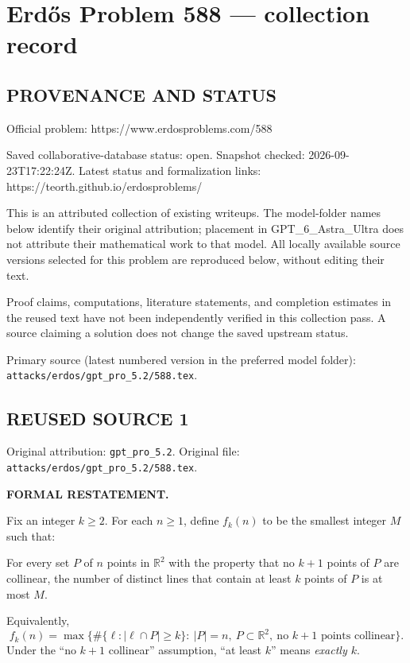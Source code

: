 \section*{Erd\H{o}s Problem 588 --- collection record}

\subsection*{PROVENANCE AND STATUS}
Official problem: https://www.erdosproblems.com/588

Saved collaborative-database status: open.
Snapshot checked: 2026-09-23T17:22:24Z.
Latest status and formalization links: https://teorth.github.io/erdosproblems/

This is an attributed collection of existing writeups. The model-folder names below identify their original attribution; placement in GPT\_6\_Astra\_Ultra does not attribute their mathematical work to that model. All locally available source versions selected for this problem are reproduced below, without editing their text.

Proof claims, computations, literature statements, and completion estimates in the reused text have not been independently verified in this collection pass. A source claiming a solution does not change the saved upstream status.

Primary source (latest numbered version in the preferred model folder): \texttt{attacks/erdos/gpt\_pro\_5.2/588.tex}.

\subsection*{REUSED SOURCE 1}
Original attribution: \texttt{gpt\_pro\_5.2}.
Original file: \texttt{attacks/erdos/gpt\_pro\_5.2/588.tex}.


\noindent\textbf{FORMAL RESTATEMENT.}

Fix an integer $k\ge 2$.
For each $n\ge 1$, define $f_k(n)$ to be the smallest integer $M$ such that:

For every set $P$ of $n$ points in $\mathbb{R}^2$ with the property that no $k+1$ points of $P$ are collinear, the number of distinct lines that contain at least $k$ points of $P$ is at most $M$.

Equivalently,
\[
 f_k(n)=\max\{\#\{\ell: |\ell\cap P|\ge k\}:\ |P|=n,\ P\subset\mathbb{R}^2,\ \text{no }k+1\text{ points collinear}\}.
\]
Under the ``no $k+1$ collinear'' assumption, ``at least $k$'' means \emph{exactly $k$}.

